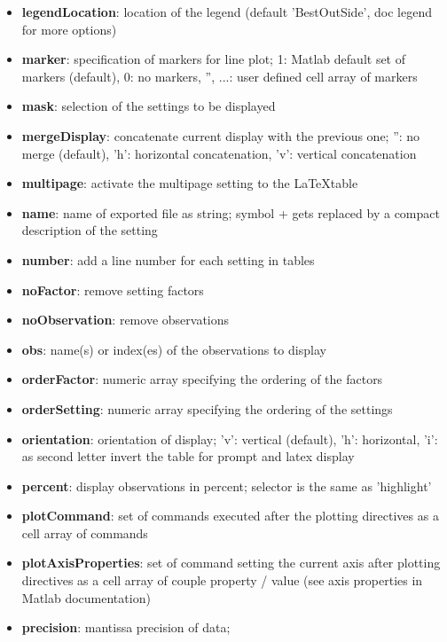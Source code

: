 \documentclass[a4paper,fleqn]{tufte-handout}
\begin{document}
\begin{itemize}
\item \textbf{legendLocation}: location of the legend (default 'BestOutSide', doc legend for more options)                 
\item \textbf{marker}:  specification of markers for line plot;
           1: Matlab default set of markers (default),
           0: no markers,
           {'', ...}: user defined cell array of markers 
\item \textbf{mask}:    selection of the settings to be displayed              
\item \textbf{mergeDisplay}: concatenate current display with the previous one;
        '': no merge (default),
        'h': horizontal concatenation,
        'v': vertical concatenation                 
\item \textbf{multipage}:   activate the multipage setting to the \LaTeX table 
\item \textbf{name}:   name of exported file as string; 
    	symbol + gets replaced by a compact description of the setting              
\item \textbf{number}:  add a line number for each setting in tables                
\item \textbf{noFactor}:  remove setting factors 
\item \textbf{noObservation}: remove observations                 
\item \textbf{obs}: name(s) or index(es) of the observations to display                 
\item \textbf{orderFactor}:   numeric array specifying the ordering of the factors
\item \textbf{orderSetting}:    numeric array specifying the ordering of the settings              
\item \textbf{orientation}:  orientation of display;
    	'v': vertical (default),
    	'h': horizontal,
       'i': as second letter invert the table for prompt and latex
           display                
\item \textbf{percent}: display observations in percent;
    	selector is the same as 'highlight'  
\item \textbf{plotCommand}:  set of commands executed after the plotting
       directives as a cell array of commands                  
\item \textbf{plotAxisProperties}: set of command setting the current axis after plotting
       directives as a cell array of couple property / value (see axis properties in Matlab documentation)  
\item \textbf{precision}:  mantissa precision of data;

\end{itemize}
\end{document}
